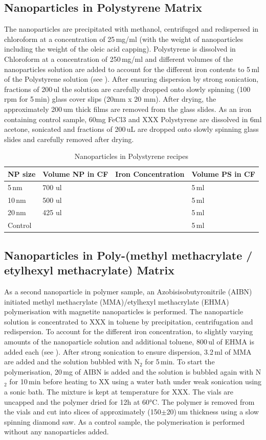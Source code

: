 \subsection{Nanoparticles in Polystyrene Matrix} 
The nanoparticles are precipitated with methanol, centrifuged and redispersed in chloroform at a concentration of 25\,mg/ml (with the weight of nanoparticles including the weight of the oleic acid capping). Polystyrene is dissolved in Chloroform at a concentration of 250\,mg/ml and different volumes of the nanoparticles solution are added to account for the different iron contents to 5\,ml of the Polystyrene solution (see ). After ensuring dispersion by strong sonication, fractions of 200\,ul the solution are carefully dropped onto slowly spinning (100 rpm for 5\,min) glass cover slips (20mm x 20 mm). After drying, the approximately 200\,um thick films are removed from the glass slides.
As an iron containing control sample, 60mg FeCl3 and XXX Polystyrene are dissolved in 6ml acetone, sonicated and  fractions of 200\,uL are dropped onto slowly spinning glass slides  and carefully removed after drying.
\begin{table}[tp]
	\centering
	\caption{Nanoparticles in Polystyrene recipes}
	\label{tab:samplePS}
	\begin{tabular}{llll}
		\hline
	NP size&   Volume NP in CF &  Iron Concentration &Volume PS in CF    \\
		\hline
	  5\,nm&700 ul & & 5\,ml  \\  
	   10\,nm&  500 ul& &5\,ml  \\    
	   20\,nm &  425 ul& &5\,ml  \\  
	   	Control   &  & &5\,ml  \\  
		\hline
	\end{tabular}
\end{table}

\subsection{Nanoparticles in Poly-(methyl methacrylate / etylhexyl methacrylate)  Matrix}
As a second nanoparticle in polymer sample, an Azobisisobutyronitrile (AIBN) initiated methyl methacrylate (MMA)/etylhexyl methacrylate (EHMA) polymerisation with magnetite nanoparticles is performed. 
The nanoparticle solution is concentrated to XXX in toluene by precipitation, centrifugation and redispersion. To account for the different iron concentration, to slightly varying amounts of the nanoparticle solution and additional toluene, 800\,ul of EHMA is added each (see ). After strong sonication to ensure dispersion, 3.2\,ml of MMA are added and the solution  bubbled with N$_2$ for 5\,min. To start the polymerisation, 20\,mg of AIBN is added and the solution is bubbled again with N$_2$  for 10\,min before heating to XX using a water bath under weak sonication using a sonic bath. The mixture is kept at temperature for XXX.
The vials are uncapped and the polymer dried for 12h at 60°C. The polymer is removed from the vials and cut into slices of approximately (150$\pm$20)\,um thickness using a slow spinning diamond saw.
As a control sample, the polymerisation is performed without any nanoparticles added.

